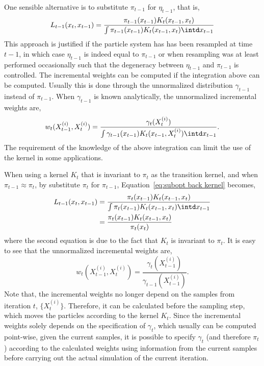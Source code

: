 One sensible alternative is to substitute $\pi_{t-1}$ for $\eta_{t-1}$, that is,
\begin{equation}
  L_{t-1}(x_t,x_{t-1}) =
  \frac{\pi_{t-1}(x_{t-1})K_t(x_{t-1},x_t)}
  {\int \pi_{t-1}(x_{t-1})K_t(x_{t-1},x_t)\intd x_{t-1}}
  \label{eq:subopt back kernel}
\end{equation}
This approach is justified if the particle system has has been resampled at time $t-1$, in which case $\eta_{t-1}$ is indeed equal to $\pi_{t-1}$ or when resampling was at least performed occasionally such that the degeneracy between $\eta_{t-1}$ and $\pi_{t-1}$ is controlled. The incremental weights can be computed if the integration above can be computed. Usually this is done through the unnormalized distribution $\gamma_{t-1}$ instead of $\pi_{t-1}$. When $\gamma_{t-1}$ is known analytically, the unnormalized incremental weights are,
\begin{equation}
  w_t(X_{t-1}^{(i)},X_t^{(i)}) =
  \frac{\gamma_t(X_t^{(i)})}
  {\int\gamma_{t-1}(x_{t-1})K_t(x_{t-1},X_t^{(i)})\intd x_{t-1}}.
  \label{eq:inc weight subopt}
\end{equation}
The requirement of the knowledge of the above integration can limit the use of the kernel in some applications.

When using a \mcmc kernel $K_t$ that is invariant to $\pi_t$ as the transition kernel, and when $\pi_{t-1}\approx\pi_t$, by substitute $\pi_t$ for $\pi_{t-1}$, Equation~\eqref{eq:subopt back kernel} becomes,
\begin{align}
  L_{t-1}(x_t,x_{t-1})
  &= \frac{\pi_t(x_{t-1})K_t(x_{t-1},x_t)}
  {\int \pi_t(x_{t-1})K_t(x_{t-1},x_t)\intd x_{t-1}} \notag\\
  &= \frac{\pi_t(x_{t-1})K_t(x_{t-1},x_t)}{\pi_t(x_t)}
  \label{eq:subopt back kernel mcmc}
\end{align}
where the second equation is due to the fact that $K_t$ is invariant to $\pi_t$. It is easy to see that the unnormalized incremental weights are,
\begin{equation}
  w_t(X_{t-1}^{(i)},X_t^{(i)}) =
  \frac{\gamma_t(X_{t-1}^{(i)})}{\gamma_{t-1}(X_{t-1}^{(i)})}.
  \label{eq:inc weight subopt mcmc}
\end{equation}
Note that, the incremental weights no longer depend on the samples from iteration $t$, $\{X_t^{(i)}\}$. Therefore, it can be calculated before the sampling step, which moves the particles according to the kernel $K_t$. Since the incremental weights solely depends on the specification of $\gamma_t$, which usually can be computed point-wise, given the current samples, it is possible to specify $\gamma_t$ (and therefore $\pi_t$) according to the calculated weights using information from the current samples before carrying out the actual simulation of the current iteration.

